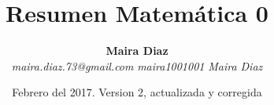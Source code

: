 \title{Resumen Matemática 0}
\author{\textbf{Maira Diaz} 
\\
\emph{maira.diaz.73@gmail.com} 
\emph{\faGithub maira1001001} 
\emph{\faLinkedinSquare Maira Diaz} }
\date{Febrero del 2017. Version 2, actualizada  y corregida}
